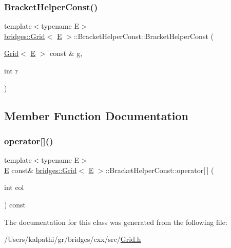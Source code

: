 \subsubsection{\texorpdfstring{BracketHelperConst()}{BracketHelperConst()}}
{\footnotesize\ttfamily template$<$typename E$>$ \\
\mbox{\hyperlink{classbridges_1_1_grid}{bridges\+::\+Grid}}$<$ \mbox{\hyperlink{namespacebridges_acfb0a4f7877d8f63de3e6862004c50eda3a3ea00cfc35332cedf6e5e9a32e94da}{E}} $>$\+::Bracket\+Helper\+Const\+::\+Bracket\+Helper\+Const (\begin{DoxyParamCaption}\item[{\mbox{\hyperlink{classbridges_1_1_grid}{Grid}}$<$ \mbox{\hyperlink{namespacebridges_acfb0a4f7877d8f63de3e6862004c50eda3a3ea00cfc35332cedf6e5e9a32e94da}{E}} $>$ const \&}]{g,  }\item[{int}]{r }\end{DoxyParamCaption})\hspace{0.3cm}{\ttfamily [inline]}}



\subsection{Member Function Documentation}
\mbox{\label{classbridges_1_1_grid_1_1_bracket_helper_const_aef4accf6080a14a2146e13bd42dc9553}} 
\subsubsection{\texorpdfstring{operator[]()}{operator[]()}}
{\footnotesize\ttfamily template$<$typename E$>$ \\
\mbox{\hyperlink{namespacebridges_acfb0a4f7877d8f63de3e6862004c50eda3a3ea00cfc35332cedf6e5e9a32e94da}{E}} const\& \mbox{\hyperlink{classbridges_1_1_grid}{bridges\+::\+Grid}}$<$ \mbox{\hyperlink{namespacebridges_acfb0a4f7877d8f63de3e6862004c50eda3a3ea00cfc35332cedf6e5e9a32e94da}{E}} $>$\+::Bracket\+Helper\+Const\+::operator\mbox{[}$\,$\mbox{]} (\begin{DoxyParamCaption}\item[{int}]{col }\end{DoxyParamCaption}) const\hspace{0.3cm}{\ttfamily [inline]}}



The documentation for this class was generated from the following file\+:\begin{DoxyCompactItemize}
\item 
/\+Users/kalpathi/gr/bridges/cxx/src/\mbox{\hyperlink{_grid_8h}{Grid.\+h}}\end{DoxyCompactItemize}
